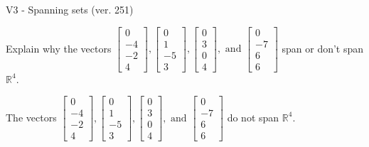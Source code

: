 \begin{exercise}
  \begin{exerciseTitle}V3 - Spanning sets (ver. 251)\end{exerciseTitle}
  \begin{exerciseStatement}
    Explain why the vectors \(\left[\begin{array}{r}
0 \\
-4 \\
-2 \\
4
\end{array}\right] , \left[\begin{array}{r}
0 \\
1 \\
-5 \\
3
\end{array}\right] , \left[\begin{array}{r}
0 \\
3 \\
0 \\
4
\end{array}\right] , \text{ and } \left[\begin{array}{r}
0 \\
-7 \\
6 \\
6
\end{array}\right]\) span or don't span \(\mathbb{R}^4\). 
	


  \end{exerciseStatement}
  \begin{exerciseAnswer}
   The vectors \(\left[\begin{array}{r}
0 \\
-4 \\
-2 \\
4
\end{array}\right] , \left[\begin{array}{r}
0 \\
1 \\
-5 \\
3
\end{array}\right] , \left[\begin{array}{r}
0 \\
3 \\
0 \\
4
\end{array}\right] , \text{ and } \left[\begin{array}{r}
0 \\
-7 \\
6 \\
6
\end{array}\right]\) 
  	 do not  
	span \(\mathbb{R}^4\).
  


  \end{exerciseAnswer}
\end{exercise}
